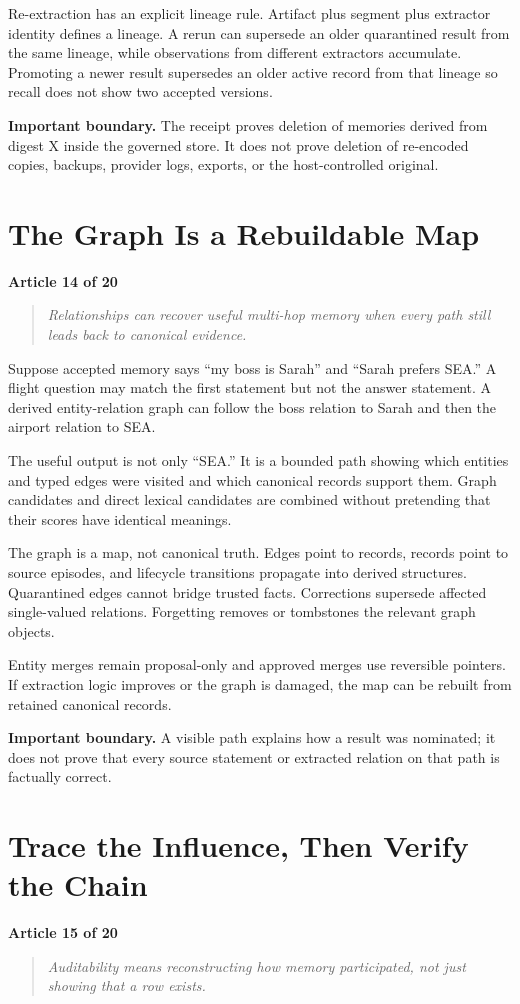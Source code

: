 \documentclass[11pt]{article}
\newcommand{\articlelabel}[1]{%
  \noindent\colorbox{aetnaTeal!10}{%
    \parbox{0.96\textwidth}{\color{aetnaInk}\small\textbf{Article #1 of 20}}}%
  \par\medskip}
\newcommand{\coreidea}[1]{%
  \begin{quote}\color{aetnaTeal}\large\itshape #1\end{quote}}
\newcommand{\boundary}[1]{%
  \par\smallskip\noindent\textbf{Important boundary.} #1}
\begin{document}
Re-extraction has an explicit lineage rule. Artifact plus segment plus
extractor identity defines a lineage. A rerun can supersede an older
quarantined result from the same lineage, while observations from different
extractors accumulate. Promoting a newer result supersedes an older active
record from that lineage so recall does not show two accepted versions.

\boundary{The receipt proves deletion of memories derived from digest X inside
the governed store. It does not prove deletion of re-encoded copies, backups,
provider logs, exports, or the host-controlled original.}

\clearpage
\section{The Graph Is a Rebuildable Map}
\articlelabel{14}
\coreidea{Relationships can recover useful multi-hop memory when every path
still leads back to canonical evidence.}

Suppose accepted memory says ``my boss is Sarah'' and ``Sarah prefers SEA.''
A flight question may match the first statement but not the answer statement.
A derived entity-relation graph can follow the boss relation to Sarah and then
the airport relation to SEA.

The useful output is not only ``SEA.'' It is a bounded path showing which
entities and typed edges were visited and which canonical records support
them. Graph candidates and direct lexical candidates are combined without
pretending that their scores have identical meanings.

The graph is a map, not canonical truth. Edges point to records, records point
to source episodes, and lifecycle transitions propagate into derived
structures. Quarantined edges cannot bridge trusted facts. Corrections
supersede affected single-valued relations. Forgetting removes or tombstones
the relevant graph objects.

Entity merges remain proposal-only and approved merges use reversible
pointers. If extraction logic improves or the graph is damaged, the map can be
rebuilt from retained canonical records.

\boundary{A visible path explains how a result was nominated; it does not
prove that every source statement or extracted relation on that path is
factually correct.}

\clearpage
\section{Trace the Influence, Then Verify the Chain}
\articlelabel{15}
\coreidea{Auditability means reconstructing how memory participated, not just
showing that a row exists.}
\end{document}

